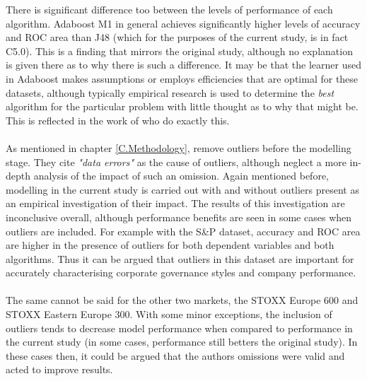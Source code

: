There is significant difference too between the levels of performance of each algorithm. Adaboost M1 in general achieves significantly higher levels of accuracy and ROC area than J48 (which for the purposes of the current study, is in fact C5.0). This is a finding that mirrors the original study, although no explanation is given there as to why there is such a difference. It may be that the learner used in Adaboost makes assumptions or employs efficiencies that are optimal for these datasets, although typically empirical research is used to determine the {\it best} algorithm for the particular problem with little thought as to why that might be. This is reflected in the work of \cite{moldovan2015learning} who do exactly this. \\\\
As mentioned in chapter \ref{C.Methodology}, \cite{moldovan2015learning} remove outliers before the modelling stage. They cite {\it "data errors"} as the cause of outliers, although neglect a more in-depth analysis of the impact of such an omission. Again mentioned before, modelling in the current study is carried out with and without outliers present as an empirical investigation of their impact. The results of this investigation are inconclusive overall, although performance benefits are seen in some cases when outliers are included. For example with the S\&P dataset, accuracy and ROC area are higher in the presence of outliers for both dependent variables and both algorithms. Thus it can be argued that outliers in this dataset are important for accurately characterising corporate governance styles and company performance. \\\\The same cannot be said for the other two markets, the STOXX Europe 600 and STOXX Eastern Europe 300. With some minor exceptions, the inclusion of outliers tends to decrease model performance when compared to performance in the current study (in some cases, performance still betters the original study). In these cases then, it could be argued that the authors omissions were valid and acted to improve results.  \\\\
